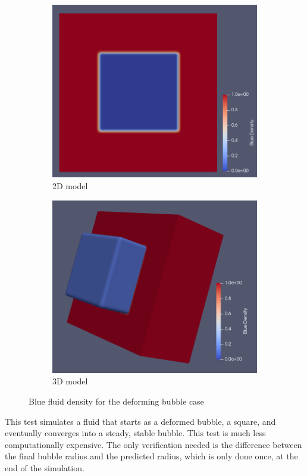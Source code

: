 \documentclass[12pt, openany]{book}
\begin{document}
\begin{figure}[H]
	\centering
	\begin{subfigure}{.49\textwidth}
		\includegraphics[width=\linewidth]{Resources/Images/square.png}
		\caption{2D model}
	\end{subfigure}
	\begin{subfigure}{.49\textwidth}
		\includegraphics[width=\linewidth]{Resources/Images/square3D.png}
		\caption{3D model}
	\end{subfigure} 
	\caption{Blue fluid density for the deforming bubble case}
	\label{fig:deforming}
\end{figure} 
This test simulates a fluid that starts as a deformed bubble, a square, and eventually converges into a steady, stable bubble. This test is much less computationally expensive. The only verification needed is the difference between the final bubble radius and the predicted radius, which is only done once, at the end of the simulation.  
\end{document}
